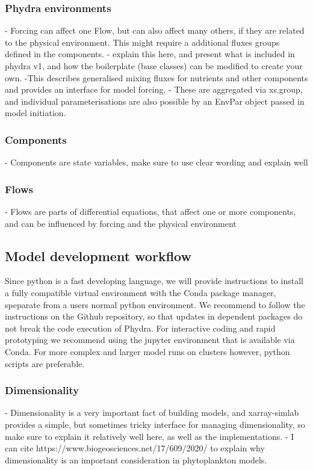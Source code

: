 \documentclass[template.tex]{subfiles}
\begin{document}
\subsubsection{Phydra environments} \label{Section:PhysicalEnvironment}

- Forcing can affect one Flow, but can also affect many others, if they are related to the physical environment. This might require a additional fluxes groups defined in the components. 
- explain this here, and present what is included in phydra v1, and how the boilerplate (base classes) can be modified to create your own.
-This describes generalised mixing fluxes for nutrients and other components and provides an interface for model forcing. 
- These are aggregated via xs.group, and individual parameterisations are also possible by an EnvPar object passed in model initiation.

\subsubsection{Components}
- Components are state variables, make sure to use clear wording and explain well

\subsubsection{Flows}
- Flows are parts of differential equations, that affect one or more components, and can be influenced by forcing and the physical environment


\subsection{Model development workflow}

Since python is a fast developing language, we will provide instructions to install a fully compatible virtual environment with the Conda package manager, speparate from a users normal python environment. We recommend to follow the instructions on the Github repository, so that updates in dependent packages do not break the code execution of Phydra. For interactive coding and rapid prototyping we recommend using the jupyter environment that is available via Conda. For more complex and larger model runs on clusters however, python scripts are preferable.

\subsubsection{Dimensionality}
- Dimensionality is a very important fact of building models, and xarray-simlab provides a simple, but sometimes tricky interface for managing dimensionality, so make sure to explain it relatively well here, as well as the implementations.
- I can cite https://www.biogeosciences.net/17/609/2020/ to explain why dimensionality is an important consideration in phytoplankton models.
\end{document}
